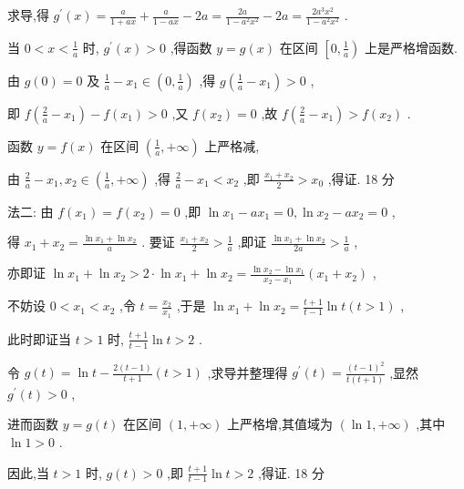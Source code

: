 \documentclass[10pt]{article}
\begin{document}
求导,得 \({g}^{\prime }\left( x\right)  = \frac{a}{1 + {ax}} + \frac{a}{1 - {ax}} - {2a} = \frac{2a}{1 - {a}^{2}{x}^{2}} - {2a} = \frac{2{a}^{3}{x}^{2}}{1 - {a}^{2}{x}^{2}}\) .

当 \(0 < x < \frac{1}{a}\) 时, \({g}^{\prime }\left( x\right)  > 0\) ,得函数 \(y = g\left( x\right)\) 在区间 \(\left\lbrack  {0,\frac{1}{a}}\right)\) 上是严格增函数.

由 \(g\left( 0\right)  = 0\) 及 \(\frac{1}{a} - {x}_{1} \in  \left( {0,\frac{1}{a}}\right)\) ,得 \(g\left( {\frac{1}{a} - {x}_{1}}\right)  > 0\) ,

即 \(f\left( {\frac{2}{a} - {x}_{1}}\right)  - f\left( {x}_{1}\right)  > 0\) ,又 \(f\left( {x}_{2}\right)  = 0\) ,故 \(f\left( {\frac{2}{a} - {x}_{1}}\right)  > f\left( {x}_{2}\right)\) .

函数 \(y = f\left( x\right)\) 在区间 \(\left( {\frac{1}{a}, + \infty }\right)\) 上严格减,

由 \(\frac{2}{a} - {x}_{1},{x}_{2} \in  \left( {\frac{1}{a}, + \infty }\right)\) ,得 \(\frac{2}{a} - {x}_{1} < {x}_{2}\) ,即 \(\frac{{x}_{1} + {x}_{2}}{2} > {x}_{0}\) ,得证. 18 分

法二: 由 \(f\left( {x}_{1}\right)  = f\left( {x}_{2}\right)  = 0\) ,即 \(\ln {x}_{1} - a{x}_{1} = 0,\ln {x}_{2} - a{x}_{2} = 0\) ,

得 \({x}_{1} + {x}_{2} = \frac{\ln {x}_{1} + \ln {x}_{2}}{a}\) . 要证 \(\frac{{x}_{1} + {x}_{2}}{2} > \frac{1}{a}\) ,即证 \(\frac{\ln {x}_{1} + \ln {x}_{2}}{2a} > \frac{1}{a}\) ,

亦即证 \(\ln {x}_{1} + \ln {x}_{2} > 2 \cdot  \ln {x}_{1} + \ln {x}_{2} = \frac{\ln {x}_{2} - \ln {x}_{1}}{{x}_{2} - {x}_{1}}\left( {{x}_{1} + {x}_{2}}\right)\) ,

不妨设 \(0 < {x}_{1} < {x}_{2}\) ,令 \(t = \frac{{x}_{2}}{{x}_{1}}\) ,于是 \(\ln {x}_{1} + \ln {x}_{2} = \frac{t + 1}{t - 1}\ln t\left( {t > 1}\right)\) ,

此时即证当 \(t > 1\) 时, \(\frac{t + 1}{t - 1}\ln t > 2\) .

令 \(g\left( t\right)  = \ln t - \frac{2\left( {t - 1}\right) }{t + 1}\left( {t > 1}\right)\) ,求导并整理得 \({g}^{\prime }\left( t\right)  = \frac{{\left( t - 1\right) }^{2}}{t\left( {t + 1}\right) }\) ,显然 \({g}^{\prime }\left( t\right)  > 0\) ,

进而函数 \(y = g\left( t\right)\) 在区间 \(\left( {1, + \infty }\right)\) 上严格增,其值域为 \(\left( {\ln 1, + \infty }\right)\) ,其中 \(\ln 1 > 0\) .

因此,当 \(t > 1\) 时, \(g\left( t\right)  > 0\) ,即 \(\frac{t + 1}{t - 1}\ln t > 2\) ,得证. 18 分
\end{document}
